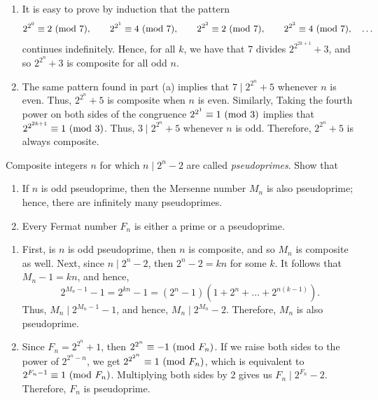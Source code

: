 \begin{solution}
    \begin{enumerate}
        \item It is easy to prove by induction that the pattern
        $$2^{2^0} \equiv 2 \ (\mathrm{mod}\ 7), \qquad 2^{2^1} \equiv 4 \ (\mathrm{mod}\ 7), \qquad 2^{2^2} \equiv 2 \ (\mathrm{mod}\ 7), \qquad 2^{2^3} \equiv 4 \ (\mathrm{mod}\ 7), \quad \dots$$
        continues indefinitely. Hence, for all $k$, we have that 7 divides $2^{2^{2k+1}} + 3$, and so $2^{2^n} + 3$ is composite for all odd $n$.
        \item The same pattern found in part (a) implies that $7 \mid 2^{2^n} + 5$ whenever $n$ is even. Thus, $2^{2^n} + 5$ is composite when $n$ is even. Similarly, Taking the fourth power on both sides of the congruence $2^{2^1} \equiv 1 \ (\mathrm{mod}\ 3)$ implies that $2^{2^{2k+1}} \equiv 1 \ (\mathrm{mod}\ 3)$. Thus, $3 \mid 2^{2^n} + 5$ whenever $n$ is odd. Therefore, $2^{2^n} + 5$ is always composite. \\
    \end{enumerate}
\end{solution}

\begin{exercise}
    Composite integers $n$ for which $n \mid 2^n - 2$ are called \textit{pseudoprimes}. Show that
    \begin{enumerate}
        \item If $n$ is odd pseudoprime, then the Mersenne number $M_n$ is also pseudoprime; hence, there are infinitely many pseudoprimes. 
        \item Every Fermat number $F_n$ is either a prime or a pseudoprime.  \\
    \end{enumerate}
\end{exercise}

\begin{solution}
    \begin{enumerate}
        \item First, is $n$ is odd pseudoprime, then $n$ is composite, and so $M_n$ is composite as well. Next, since $n \mid 2^n - 2$, then $2^n - 2 = kn$ for some $k$. It follows that $M_n - 1 = kn$, and hence,
        $$2^{M_n - 1} - 1 = 2^{kn} - 1 = (2^n - 1)(1 + 2^n + \dots + 2^{n(k-1)}).$$
        Thus, $M_n \mid 2^{M_n - 1} - 1$, and hence, $M_n \mid 2^{M_n} - 2$. Therefore, $M_n$ is also pseudoprime.
        \item Since $F_n = 2^{2^n} + 1$, then $2^{2^n} \equiv -1 \ (\mathrm{mod}\ F_n)$. If we raise both sides to the power of $2^{2^n - n}$, we get $2^{2^{2^n}} \equiv 1 \ (\mathrm{mod}\ F_n)$, which is equivalent to $2^{F_n - 1} \equiv 1 \ (\mathrm{mod}\ F_n)$. Multiplying both sides by 2 gives us $F_n \mid 2^{F_n} - 2$. Therefore, $F_n$ is pseudoprime. \\
    \end{enumerate}
\end{solution}


